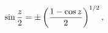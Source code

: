 \[\mathop{\sin\/}\nolimits\frac{z}{2}=\pm\left(\frac{1-\mathop{\cos\/}\nolimits z%
}{2}\right)^{1/2},\]